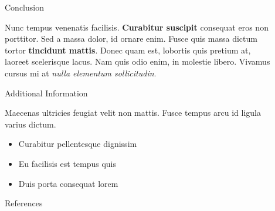 \documentclass[final]{beamer}
\newlength{\sepwid}
\newlength{\onecolwid}
\newlength{\twocolwid}
\begin{document}
\begin{frame}[t]
\begin{columns}[t]
\begin{column}{\twocolwid}
\end{column} %

\begin{column}{\sepwid}\end{column} %

\begin{column}{\onecolwid} %


\begin{block}{Conclusion}

Nunc tempus venenatis facilisis. \textbf{Curabitur suscipit} consequat eros non porttitor. Sed a massa dolor, id ornare enim. Fusce quis massa dictum tortor \textbf{tincidunt mattis}. Donec quam est, lobortis quis pretium at, laoreet scelerisque lacus. Nam quis odio enim, in molestie libero. Vivamus cursus mi at \textit{nulla elementum sollicitudin}.

\end{block}


\begin{block}{Additional Information}

Maecenas ultricies feugiat velit non mattis. Fusce tempus arcu id ligula varius dictum.
\begin{itemize}
\item Curabitur pellentesque dignissim
\item Eu facilisis est tempus quis
\item Duis porta consequat lorem
\end{itemize}

\end{block}


\begin{block}{References}

\nocite{*} %
\small{
\vspace{0.75in}}


\end{block}
\end{column}
\end{columns}
\end{frame}
\end{document}
